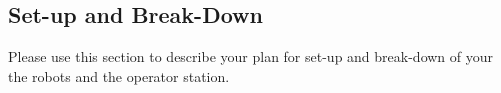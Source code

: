 \subsection{Set-up and Break-Down}
Please use this section to describe your plan for set-up and break-down of your the robots and the operator station.